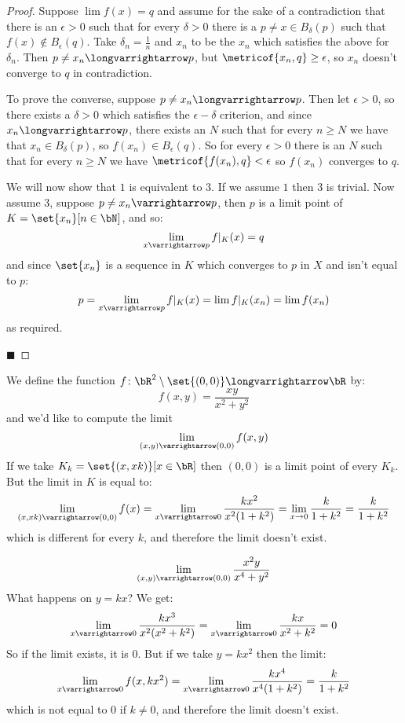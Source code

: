\documentclass[10pt]{article}
\begin{document}
\begin{proof}

    Suppose $\lim f(x)=q$ and assume for the sake of a contradiction that there is an $\epsilon>0$ such that for every $\delta>0$ there is a $p\neq x\in B_\delta(p)$ such that $f(x)\notin B_\epsilon(q)$.
    Take $\delta_n=\frac1n$ and $x_n$ to be the $x_n$ which satisfies the above for $\delta_n$.
    Then $p\neq x_n\longvarrightarrow p$, but $\metricof{x_n, q}\geq\epsilon$, so $x_n$ doesn't converge to $q$ in contradiction.

    To prove the converse, suppose $p\neq x_n\longvarrightarrow p$.
    Then let $\epsilon>0$, so there exists a $\delta>0$ which satisfies the $\epsilon-\delta$ criterion, and since $x_n\longvarrightarrow p$, there exists an $N$ such that for every $n\geq N$ we have that
    $x_n\in B_\delta(p)$, so $f(x_n)\in B_\epsilon(q)$.
    So for every $\epsilon>0$ there is an $N$ such that for every $n\geq N$ we have $\metricof{f(x_n), q}<\epsilon$ so $f(x_n)$ converges to $q$.

    We will now show that $1$ is equivalent to $3$.
    If we assume $1$ then $3$ is trivial.
    Now assume $3$, suppose $p\neq x_n\varrightarrow p$, then $p$ is a limit point of $K=\set{x_n}[n\in\bN]$, and so:
    \[ \lim_{x\varrightarrow p}f\vert_K(x) = q \]
    and since $\set{x_n}$ is a sequence in $K$ which converges to $p$ in $X$ and isn't equal to $p$:
    \[ p = \lim_{x\varrightarrow p}f\vert_K(x) = \lim f\vert_K(x_n) = \lim f(x_n) \]
    as required.

    \hfill$\blacksquare$

\end{proof}

\begin{exam}

    We define the function $f\colon\bR^2\setminus\set{(0,0)}\longvarrightarrow\bR$ by:
    \[ f(x,y) = \frac{xy}{x^2 + y^2} \]
    and we'd like to compute the limit
    \[ \lim_{(x,y)\varrightarrow(0,0)}f(x,y) \]
    If we take $K_k=\set{(x,xk)}[x\in\bR]$ then $(0,0)$ is a limit point of every $K_k$.
    But the limit in $K$ is equal to:
    \[ \lim_{(x,xk)\varrightarrow(0,0)} f(x) = \lim_{x\varrightarrow0}\frac{kx^2}{x^2(1+k^2)} = \lim_{x\to0}\frac{k}{1+k^2} = \frac{k}{1+k^2} \]
    which is different for every $k$, and therefore the limit doesn't exist.

\end{exam}

\begin{exam}

    \[ \lim_{(x,y)\varrightarrow(0,0)}\frac{x^2y}{x^4+y^2} \]
    What happens on $y=kx$? We get:
    \[ \lim_{x\varrightarrow0}\frac{kx^3}{x^2(x^2+k^2)} = \lim_{x\varrightarrow0}\frac{kx}{x^2+k^2} = 0 \]
    So if the limit exists, it is $0$.
    But if we take $y=kx^2$ then the limit:
    \[ \lim_{x\varrightarrow0}f(x,kx^2) = \lim_{x\varrightarrow0}\frac{kx^4}{x^4(1+k^2)} = \frac{k}{1+k^2} \]
    which is not equal to $0$ if $k\neq0$, and therefore the limit doesn't exist.

\end{exam}
\end{document}
